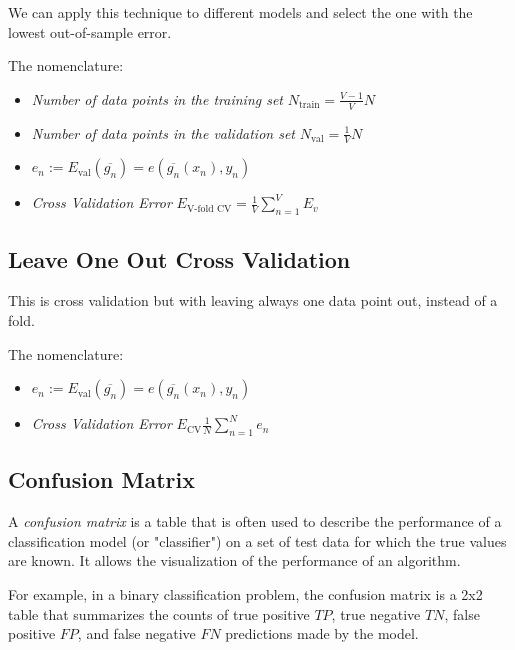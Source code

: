We can apply this technique to different models and select the one with the lowest out-of-sample error.

The nomenclature:

\begin{itemize}
    
    \item \emph{Number of data points in the training set} \(N_{\text{train}} = \frac{V - 1}{V} N\)

    \item \emph{Number of data points in the validation set} \(N_{\text{val}} = \frac{1}{V} N\)

    \item \(e_n:= E_{\text{val}} (\overline{g_n}) = e(\overline{g_n}(x_n), y_n)\)

    \item \emph{Cross Validation Error} \(E_{\text{V-fold CV}} = \frac{1}{V} \sum_{n = 1}^{V} E_v\)

\end{itemize}

\subsection{Leave One Out Cross Validation}

This is cross validation but with leaving always one data point out, instead of a fold.

The nomenclature:

\begin{itemize}
    
    \item \(e_n:= E_{\text{val}} (\overline{g_n}) = e(\overline{g_n}(x_n), y_n)\)

    \item \emph{Cross Validation Error} \(E_{\text{CV}} \frac{1}{N} \sum_{n = 1}^{N} e_n\)

\end{itemize}

\subsection{Confusion Matrix}

A \emph{confusion matrix} is a table that is often used to describe the performance of a classification model (or "classifier") on a set of test data for 
which the true values are known. It allows the visualization of the performance of an algorithm. 

For example, in a binary classification problem, the confusion matrix is a 2x2 table that summarizes the counts of true positive \(TP\), 
true negative \(TN\), false positive \(FP\), and false negative \(FN\) predictions made by the model. 


